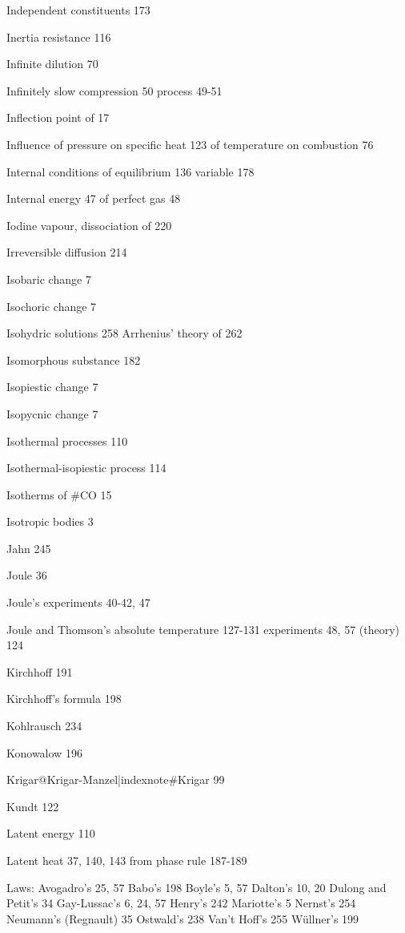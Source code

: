 \documentclass[12pt]{book}[2005/09/16]
\newcommand{\PageSep}[1]{\ignorespaces}
\begin{document}
Independent constituents 173

Inertia resistance 116

Infinite dilution 70

Infinitely slow
  compression 50
  process 49-51

Inflection
  point of 17

Influence
  of pressure on specific heat 123
  of temperature on combustion 76

Internal conditions of equilibrium 136
  variable 178

Internal energy 47
  of perfect gas 48

Iodine vapour, dissociation of 220

Irreversible diffusion 214

Isobaric change 7

Isochoric change 7

Isohydric solutions 258
  Arrhenius' theory of 262

Isomorphous substance 182

Isopiestic change 7

Isopycnic change 7

Isothermal processes 110

Isothermal-isopiestic process 114

Isotherms of #CO 15

Isotropic bodies 3



Jahn 245

Joule 36

Joule's experiments 40-42, 47

Joule and Thomson's absolute temperature 127-131
  experiments 48, 57
  (theory) 124



Kirchhoff 191

Kirchhoff's formula 198

Kohlrausch 234

Konowalow 196

Krigar@Krigar-Manzel|indexnote#Krigar 99

Kundt 122



Latent energy 110

Latent heat 37, 140, 143
  from phase rule 187-189

Laws:
  Avogadro's 25, 57
  Babo's 198
  Boyle's 5, 57
  Dalton's 10, 20
  Dulong and Petit's 34
  Gay-Lussac's 6, 24, 57
  Henry's 242
  Mariotte's 5
  Nernst's 254
  Neumann's (Regnault) 35
  Ostwald's 238
  Van't Hoff's 255
  Wüllner's 199
\end{document}
